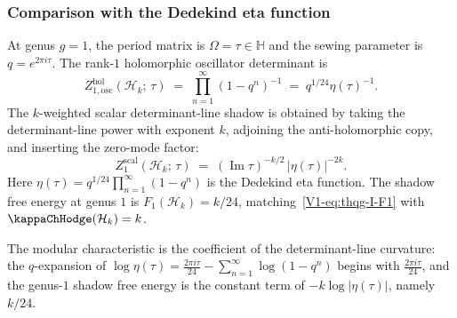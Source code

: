 \subsubsection{Comparison with the Dedekind eta function}

\begin{example}
At genus $g = 1$, the period matrix is $\Omega = \tau \in \mathbb{H}$ and the sewing parameter is $q = e^{2\pi i\tau}$. The rank-$1$ holomorphic oscillator determinant is
\begin{equation}%
Z_{1,\mathrm{osc}}^{\mathrm{hol}}(\mathcal{H}_k;\,\tau)
\;=\;
\prod_{n=1}^{\infty} (1 - q^n)^{-1}
\;=\;
q^{1/24}\eta(\tau)^{-1}.
\end{equation}
The $k$-weighted scalar determinant-line shadow is obtained by taking
the determinant-line power with exponent $k$, adjoining the anti-holomorphic
copy, and inserting the zero-mode factor:
\begin{equation}%
Z_{1}^{\mathrm{scal}}(\mathcal{H}_k;\,\tau)
\;=\;
(\operatorname{Im}\tau)^{-k/2}\,\bigl|\eta(\tau)\bigr|^{-2k}.
\end{equation}
Here $\eta(\tau) = q^{1/24}\prod_{n=1}^{\infty}(1 - q^n)$ is the Dedekind eta function. The shadow free energy at genus $1$ is $F_1(\mathcal{H}_k) = k/24$, matching~\eqref{V1-eq:thqg-I-F1} with $\kappaChHodge(\mathcal H_k) = k$.

The modular characteristic is the coefficient of the determinant-line
curvature: the $q$-expansion of
$\log \eta(\tau) = \frac{2\pi i\tau}{24} - \sum_{n=1}^\infty \log(1-q^n)$
begins with $\frac{2\pi i \tau}{24}$, and the genus-$1$ shadow
free energy is the constant term of $-k\log|\eta(\tau)|$, namely
$k/24$.
\end{example}

